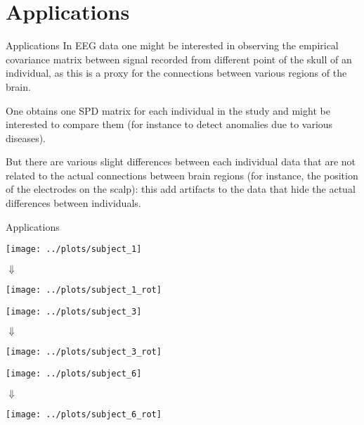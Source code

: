 \documentclass[xcolor=dvipsnames,aspectratio=169]{beamer}
\begin{document}
    \section{Applications}
    \begin{frame}[t]{Applications}
        In EEG data one might be interested in observing the \alert{empirical covariance matrix} between signal recorded from different point of the skull of an individual, as this is a proxy for the \alert{connections between various regions of the brain}.

        One obtains one SPD matrix for each individual in the study and might be interested to compare them (for instance to detect anomalies due to various diseases).

        But there are various slight differences between each individual data that are not related to the actual connections between brain regions (for instance, the position of the electrodes on the scalp): this add artifacts to the data that hide the actual differences between individuals.

        \nocite{eeg_data}
    \end{frame}

    \begin{frame}{Applications}

        \begin{minipage}{0.3\textwidth}
            \centering
            \texttt{[image: ../plots/subject\_1]}

            $\Downarrow$

            \texttt{[image: ../plots/subject\_1\_rot]}
        \end{minipage}\hfill
        \begin{minipage}{0.3\textwidth}
            \centering
            \texttt{[image: ../plots/subject\_3]}

            $\Downarrow$

            \texttt{[image: ../plots/subject\_3\_rot]}
        \end{minipage}\hfill
        \begin{minipage}{0.3\textwidth}
            \centering
            \texttt{[image: ../plots/subject\_6]}

            $\Downarrow$

            \texttt{[image: ../plots/subject\_6\_rot]}
        \end{minipage}
    \end{frame}
\end{document}
